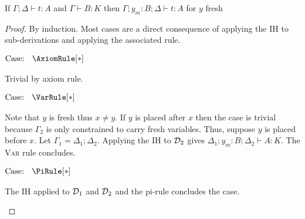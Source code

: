 \begin{lemma}[Weakening]
    \label{lem:2:weakening}
    If $\Gamma; \Delta \vdash t : A$ and $\Gamma \vdash B : K$ then $\Gamma; y_m : B; \Delta \vdash t : A$ for $y$ fresh
\end{lemma}
\begin{proof}
    By induction.
    Most cases are a direct consequence of applying the IH to sub-derivations and applying the associated rule.

    $\text{Case: }\begin{array}{c} \AxiomRule[*] \end{array}$
    \begin{proofcase}
        Trivial by axiom rule.
    \end{proofcase}

    $\text{Case: }\begin{array}{c} \VarRule[*] \end{array}$
    \begin{proofcase}
        Note that $y$ is fresh thus $x \neq y$.
        If $y$ is placed after $x$ then the case is trivial because $\Gamma_2$ is only constrained to carry fresh variables.
        Thus, suppose $y$ is placed before $x$.
        Let $\Gamma_1 = \Delta_1; \Delta_2$.
        Applying the IH to $\mathcal{D}_{2}$ gives $\Delta_1; y_m : B; \Delta_2 \vdash A : K$.
        The \textsc{Var} rule concludes.
    \end{proofcase}

    $\text{Case: }\begin{array}{c} \PiRule[*] \end{array}$
    \begin{proofcase}
        The IH applied to $\mathcal{D}_{1}$ and $\mathcal{D}_{2}$ and the pi-rule concludes the case.
    \end{proofcase}
\end{proof}

